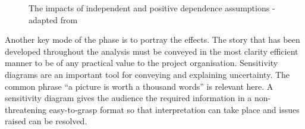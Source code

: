\begin{figure}[!h]
  \centering
{}

\caption{The impacts of independent and positive dependence assumptions - adapted from \cite{chapman}}
\label{Figure:ImpactsDependence}
\end{figure}

Another key mode of the phase is to portray the effects. 
The story that has been developed throughout the analysis must be conveyed in the most clarity efficient manner to be of any practical value to the project organisation.
Sensitivity diagrams are an important tool for conveying and explaining uncertainty.
The common phrase ``a picture is worth a thousand words'' is relevant here.
A sensitivity diagram gives the audience the required information in a non-threatening easy-to-grasp format so that interpretation can take place and issues raised can be resolved.

